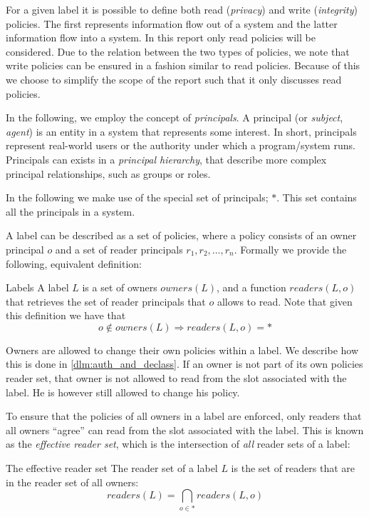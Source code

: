 For a given label it is possible to define both read (\emph{privacy}) and write (\emph{integrity}) policies.
The first represents information flow out of a system and the latter information flow into a system.
In this report only read policies will be considered.
Due to the relation between the two types of policies, we note that write policies can be ensured in a fashion similar to read policies.
Because of this we choose to simplify the scope of the report such that it only discusses read policies.

In the following, we employ the concept of \emph{principals}.
A principal (or \emph{subject}, \emph{agent}) is an entity in a system that represents some interest.
In short, principals represent real-world users or the authority under which a program/system runs.
Principals can exists in a \emph{principal hierarchy}, that describe more complex principal relationships, such as groups or roles.

In the following we make use of the special set of principals; $*$.
This set contains all the principals in a system.

A label can be described as a set of policies, where a policy consists of an owner principal $o$ and a set of reader principals $r_1, r_2, \dots, r_n$.
Formally we provide the following, equivalent definition:
\begin{definition}{Labels}\label{dlm:def:label}
A label $L$ is a set of owners $owners(L)$, and a function $readers(L, o)$ that retrieves the set of reader principals that $o$ allows to read.
Note that given this definition we have that $$o \notin owners(L) \Rightarrow readers(L, o) = *$$
\end{definition}

Owners are allowed to change their own policies within a label.
We describe how this is done in \cref{dlm:auth_and_declass}.
If an owner is not part of its own policies reader set, that owner is not allowed to read from the slot associated with the label.
He is however still allowed to change his policy.

To ensure that the policies of all owners in a label are enforced, only readers that all owners ``agree'' can read from the slot associated with the label.
This is known as the \emph{effective reader set}, which is the intersection of \emph{all} reader sets of a label:
\begin{definition}{The effective reader set}
  The reader set of a label $L$ is the set of readers that are in the reader set of all owners:
  $$readers(L) = \bigcap_{o \in *} readers(L, o)$$
\end{definition}

